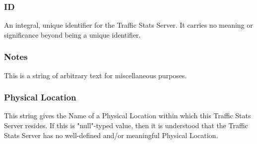\subsubsection{ID}
An integral, unique identifier for the Traffic Stats Server. It carries no
meaning or significance beyond being a unique identifier.

\subsubsection{Notes}
This is a string of arbitrary text for miscellaneous purposes.

\subsubsection{Physical Location}
This string gives the Name of a Physical Location within which this Traffic
Stats Server resides. If this is "null"-typed value, then it is understood that
the Traffic Stats Server has no well-defined and/or meaningful Physical
Location.
